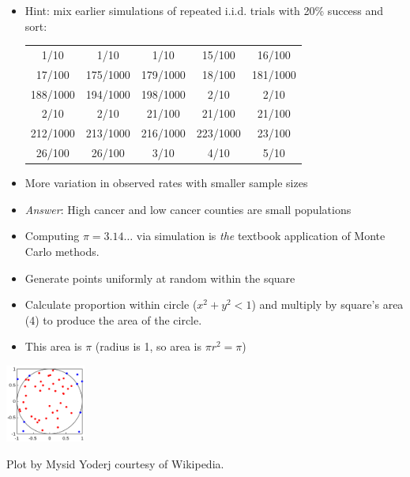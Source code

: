 \documentclass[10pt]{report}
\begin{document}
%
\begin{itemize}
\item Hint: mix earlier simulations of repeated i.i.d. trials with 20\% success and sort:
{\footnotesize
\begin{center}
\begin{tabular}{ccccc}
1/10 &  1/10 &  1/10 &  15/100 &  16/100
\\
17/100 &  175/1000 &  179/1000 &  18/100 &  181/1000
\\
188/1000 &  194/1000 &  198/1000 & 2/10 &  2/10 
\\
2/10 &  2/10 & 21/100 &  21/100 &  21/100 
\\
212/1000 &  213/1000 &   216/1000 &   223/1000 &  23/100
\\
26/100 &  26/100 &  3/10 &  4/10 &  5/10 
\end{tabular}
\end{center}
}
\item More variation in observed rates with smaller sample sizes
\vfill
\item \emph{Answer}: High cancer and low cancer counties are small populations
\end{itemize}




\noindent
\begin{minipage}[t]{0.65\textwidth}
\vspace*{2pt}
\begin{itemize}
\item Computing $\pi = 3.14\ldots$ via simulation is \emph{the} textbook application
of Monte Carlo methods.
\vfill
\item Generate points uniformly at random within the square
\item Calculate proportion within circle ($x^2 + y^2 < 1$) and multiply by square's area (4) to produce the area of the circle.
\item This area is $\pi$ (radius is 1, so area is $\pi r^2 = \pi$)
\end{itemize}
\end{minipage}
%
\begin{minipage}[t]{0.34\textwidth}
\vspace*{12pt}
\hfill \includegraphics[height=1in]{img/mc-integration-wikipedia.png}
\\
\end{minipage}
\vfill
{ } \hfill {\tiny Plot by Mysid Yoderj courtesy of Wikipedia.}
\end{document}
